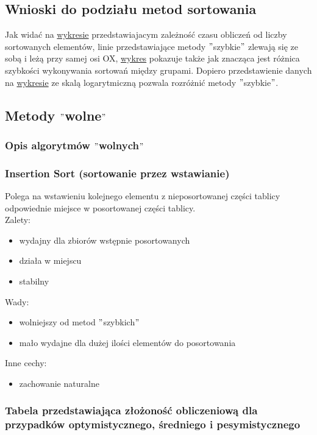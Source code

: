 \documentclass[polish,polish,a4paper]{article}
\begin{document}
\begin{spacing}{1.5}
	\subsection*{Wnioski do podziału metod sortowania}
	
	Jak widać na \hyperref[fig:2wszn]{wykresie} przedstawiajacym zależność czasu obliczeń od liczby sortowanych elementów, linie przedstawiające metody $ " $szybkie$ " $ zlewają się ze sobą i leżą przy samej osi OX, \hyperref[fig:2wszn]{wykres} pokazuje także jak znacząca jest różnica szybkości wykonywania sortowań między grupami. Dopiero przedstawienie danych na \hyperref[fig:2wszl]{wykresie} ze skalą logarytmiczną pozwala rozróżnić metody $"$szybkie$"$.
	
	\subsection{Metody $ "$wolne$" $}
	\subsubsection{Opis algorytmów $"$wolnych$"$}
	\subsubsection*{Insertion Sort (sortowanie przez wstawianie)}
	Polega na wstawieniu kolejnego elementu z nieposortowanej części tablicy odpowiednie miejsce w posortowanej części tablicy.\\
	
	Zalety:
	\begin{itemize}
		\item wydajny dla zbiorów wstępnie posortowanych
		\item działa w miejscu
		\item stabilny 
	\end{itemize}
	Wady:
	\begin{itemize}
		\item wolniejszy od metod $ " $szybkich$ " $
		\item mało wydajne dla dużej ilości elementów do posortowania
	\end{itemize}
	Inne cechy:
	\begin{itemize}
		\item zachowanie naturalne
	\end{itemize}
	
				\subsubsection*{Tabela przedstawiająca złożoność obliczeniową dla przypadków optymistycznego, średniego i pesymistycznego} 
	

\end{spacing}
\end{document}
